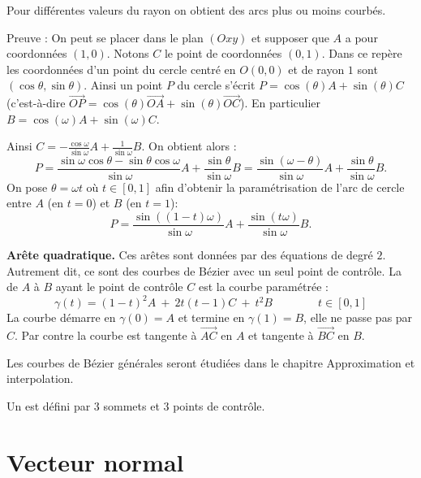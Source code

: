 \documentclass[11pt,class=report,crop=false]{standalone}
\begin{document}
Pour différentes valeurs du rayon on obtient des arcs plus ou moins courbés.

Preuve : On peut se placer dans le plan $(Oxy)$ et supposer que $A$ a pour coordonnées $(1,0)$. Notons $C$ le point de coordonnées $(0,1)$. Dans ce repère les coordonnées d'un point du cercle centré en $O(0,0)$ et de rayon $1$ sont $(\cos\theta, \sin\theta)$. 
Ainsi un point $P$ du cercle s'écrit $P = \cos(\theta) A + \sin(\theta) C$ (c'est-à-dire
$\vec{OP} =  \cos(\theta) \vec{OA} + \sin(\theta) \vec{OC}$).
En particulier $B = \cos(\omega) A + \sin(\omega) C$.


Ainsi $C = -\frac{\cos\omega}{\sin\omega}A + \frac{1}{\sin\omega}B$. On obtient alors :
$$P = \frac{\sin\omega\cos\theta - \sin\theta\cos\omega}{\sin\omega}A + \frac{\sin\theta}{\sin\omega}B
= \frac{\sin(\omega-\theta)}{\sin\omega}A + \frac{\sin\theta}{\sin\omega}B.$$
On pose $\theta = \omega t$ où $t \in [0,1]$ afin d'obtenir la paramétrisation de l'arc de cercle entre $A$ (en $t=0$) et $B$ (en $t=1$):
$$P 
= \frac{\sin((1-t)\omega)}{\sin\omega}A + \frac{\sin(t\omega)}{\sin\omega}B.$$
 

\bigskip

\textbf{Arête quadratique.} Ces arêtes sont données par des équations de degré $2$.
Autrement dit, ce sont des courbes de Bézier avec un seul point de contrôle.
La  de $A$ à $B$ ayant le point de contrôle $C$ est la courbe paramétrée :
$$\gamma(t) = (1-t)^2 A \ + \  2t(t-1) C \ + \ t^2 B \qquad\qquad t \in [0,1]$$
La courbe démarre en $\gamma(0) = A$ et termine en $\gamma(1) = B$, elle ne passe pas par $C$. Par contre la courbe est tangente à $\vec{AC}$ en $A$ et tangente à $\vec{BC}$ en $B$. 


Les courbes de Bézier générales seront étudiées dans le chapitre \og{}Approximation et interpolation\fg{}.

Un  est défini par $3$ sommets et $3$ points de contrôle.



\section{Vecteur normal}
\end{document}
